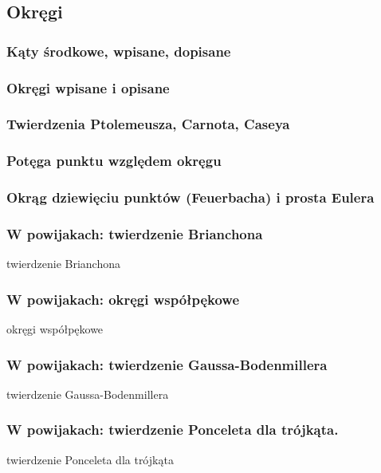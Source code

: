 \subsection{Okręgi}
\subsubsection{Kąty środkowe, wpisane, dopisane}


\subsubsection{Okręgi wpisane i opisane}


\subsubsection{Twierdzenia Ptolemeusza, Carnota, Caseya}


\subsubsection{Potęga punktu względem okręgu}


\subsubsection{Okrąg dziewięciu punktów (Feuerbacha) i prosta Eulera}


\subsubsection{W powijakach: twierdzenie Brianchona}
twierdzenie Brianchona

\subsubsection{W powijakach: okręgi współpękowe}
okręgi współpękowe

\subsubsection{W powijakach: twierdzenie Gaussa-Bodenmillera}
twierdzenie Gaussa-Bodenmillera

\subsubsection{W powijakach: twierdzenie Ponceleta dla trójkąta.}
twierdzenie Ponceleta dla trójkąta
